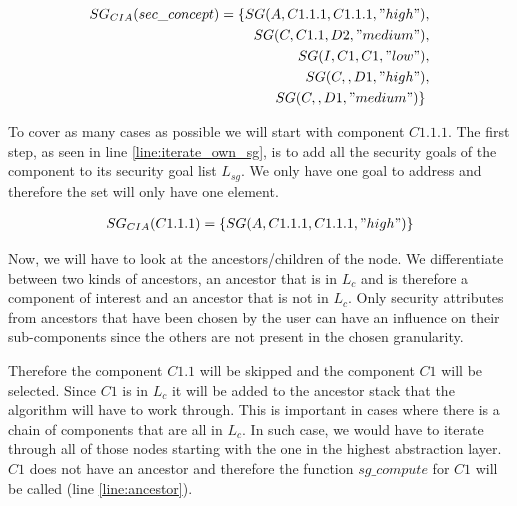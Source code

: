 \begin{align*}
SG_{CIA}(sec\_concept) = \{SG(A,C1.1.1,C1.1.1,"high") &, \\ SG(C,C1.1,D2,"medium")&, \\
SG(I,C1,C1,"low")&, \\
SG(C,,D1,"high")&, \\
SG(C,,D1,"medium")\} 
\end{align*}

To cover as many cases as possible we will start with component $C1.1.1$. The first step, as seen in line \ref{line:iterate_own_sg}, is to add all the security goals of the component to its security goal list $L_{sg}$. We only have one goal to address and therefore the set will only have one element.

\begin{align*}
SG_{CIA}(C1.1.1) = \{SG(A,C1.1.1,C1.1.1,"high")\}
\end{align*}

Now, we will have to look at the ancestors/children of the node. We differentiate between two kinds of ancestors, an ancestor that is in $L_c$ and is therefore a component of interest and an ancestor that is not in $L_c$. Only security attributes from ancestors that have been chosen by the user can have an influence on their sub-components since the others are not present in the chosen granularity. 

Therefore the component $C1.1$ will be skipped and the component $C1$ will be selected. Since $C1$ is in $L_c$ it will be added to the ancestor stack that the algorithm will have to work through. This is important in cases where there is a chain of components that are all in $L_c$. In such case, we would have to iterate through all of those nodes starting with the one in the highest abstraction layer. $C1$ does not have an ancestor and therefore the function $sg\_compute$ for $C1$ will be called (line \ref{line:ancestor}).

